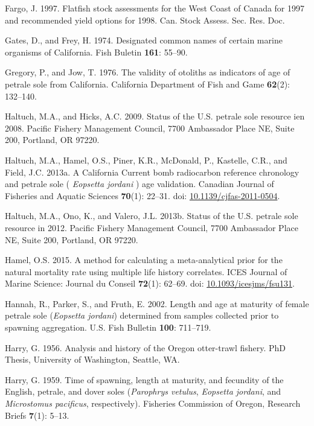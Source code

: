 \documentclass[12pt,]{article}
\begin{document}
\hypertarget{ref-fargo_j.j._flatfish_1997}{}
Fargo, J. 1997. Flatfish stock assessments for the West Coast of Canada
for 1997 and recommended yield options for 1998. Can. Stock Assess. Sec.
Res. Doc.

\hypertarget{ref-gates_designated_1974}{}
Gates, D., and Frey, H. 1974. Designated common names of certain marine
organisms of California. Fish Buletin \textbf{161}: 55--90.

\hypertarget{ref-gregory_validity_1976}{}
Gregory, P., and Jow, T. 1976. The validity of otoliths as indicators of
age of petrale sole from California. California Department of Fish and
Game \textbf{62}(2): 132--140.

\hypertarget{ref-haltuch_status_2009}{}
Haltuch, M.A., and Hicks, A.C. 2009. Status of the U.S. petrale sole
resource ien 2008. Pacific Fishery Management Council, 7700 Ambassador
Place NE, Suite 200, Portland, OR 97220.

\hypertarget{ref-haltuch_california_2013}{}
Haltuch, M.A., Hamel, O.S., Piner, K.R., McDonald, P., Kastelle, C.R.,
and Field, J.C. 2013a. A California Current bomb radiocarbon reference
chronology and petrale sole ( \emph{Eopsetta jordani} ) age validation.
Canadian Journal of Fisheries and Aquatic Sciences \textbf{70}(1):
22--31. doi:
\href{https://doi.org/10.1139/cjfas-2011-0504}{10.1139/cjfas-2011-0504}.

\hypertarget{ref-haltuch_status_2013}{}
Haltuch, M.A., Ono, K., and Valero, J.L. 2013b. Status of the U.S.
petrale sole resource in 2012. Pacific Fishery Management Council, 7700
Ambassador Place NE, Suite 200, Portland, OR 97220.

\hypertarget{ref-hamel_method_2015}{}
Hamel, O.S. 2015. A method for calculating a meta-analytical prior for
the natural mortality rate using multiple life history correlates. ICES
Journal of Marine Science: Journal du Conseil \textbf{72}(1): 62--69.
doi:
\href{https://doi.org/10.1093/icesjms/fsu131}{10.1093/icesjms/fsu131}.

\hypertarget{ref-hannah_length_2002}{}
Hannah, R., Parker, S., and Fruth, E. 2002. Length and age at maturity
of female petrale sole (\emph{Eopsetta jordani}) determined from samples
collected prior to spawning aggregation. U.S. Fish Bulletin
\textbf{100}: 711--719.

\hypertarget{ref-harry_analysis_1956}{}
Harry, G. 1956. Analysis and history of the Oregon otter-trawl fishery.
PhD Thesis, University of Washington, Seattle, WA.

\hypertarget{ref-harry_time_1959}{}
Harry, G. 1959. Time of spawning, length at maturity, and fecundity of
the English, petrale, and dover soles (\emph{Parophrys vetulus},
\emph{Eopsetta jordani}, and \emph{Microstomus pacificus},
respectively). Fisheries Commission of Oregon, Research Briefs
\textbf{7}(1): 5--13.
\end{document}
